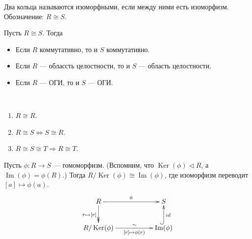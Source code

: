\documentclass[12pt,a4paper]{article}
\DeclareMathOperator{\Img}{Im}
\DeclareMathOperator{\Ker}{Ker}
\begin{document}
    \begin{definition}
        Два кольца называются изоморфными, если между ними есть изоморфизм. Обозначение: $R \cong S$.
    \end{definition}

    \begin{statement}
        Пусть $R \cong S$. Тогда
        \begin{itemize}
            \item Если $R$ коммутативно, то и $S$ коммутативно.
            \item Если $R$ --- облассть целостности, то и $S$ --- область целостности.
            \item Если $R$ --- ОГИ, то и $S$ --- ОГИ.
        \end{itemize}
    \end{statement}

    \begin{statement}\ 
        \begin{enumerate}
            \item $R \cong R$.
            \item $R \cong S \Leftrightarrow S \cong R$.
            \item $R \cong S \cong T \Rightarrow R \cong T$.
        \end{enumerate}
    \end{statement}

    \begin{theorem}
        Пусть $\phi: R \to S$ --- гомоморфизм. (Вспомним, что $\Ker(\phi) \triangleleft R$, а $\Img(\phi) = \phi(R)$.) Тогда $R/\Ker(\phi) \cong \Img(\phi)$, где изоморфизм переводит $[a] \mapsto \phi(a)$.
        \[
            \xymatrix{
                R \ar@{->>}[d]_{r \mapsto [r]} \ar[rr]^\phi && S\\
                R/\Ker(\phi) \ar[rr]^-\sim_-{[r] \mapsto \phi(r)} && \Img(\phi) \ar@{^{(}->}[u]_{id}
            }
        \]
    \end{theorem}
\end{document}
